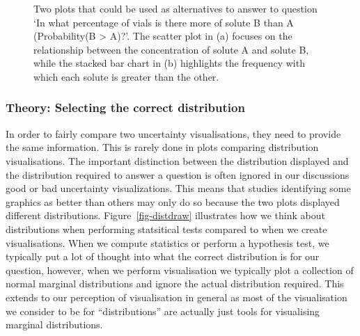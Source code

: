 \documentclass[
  letterpaper,
  DIV=11,
  numbers=noendperiod]{scrartcl}
\begin{document}
\begin{figure}
\begin{minipage}[t]{0.50\linewidth}
{{}

}

\end{minipage}%

\caption{\label{fig-alternatives}Two plots that could be used as
alternatives to answer to question `In what percentage of vials is there
more of solute B than A (Probability(B \textgreater{} A)?'. The scatter
plot in (a) focuses on the relationship between the concentration of
solute A and solute B, while the stacked bar chart in (b) highlights the
frequency with which each solute is greater than the other.}

\end{figure}

\hypertarget{theory-selecting-the-correct-distribution}{%
\subsubsection{Theory: Selecting the correct
distribution}\label{theory-selecting-the-correct-distribution}}

In order to fairly compare two uncertainty visualisations, they need to
provide the same information. This is rarely done in plots comparing
distribution visualisations. The important distinction between the
distribution displayed and the distribution required to answer a
question is often ignored in our discussions good or bad uncertainty
visualizations. This means that studies identifying some graphics as
better than others may only do so because the two plots displayed
different distributions. Figure~\ref{fig-distdraw} illustrates how we
think about distributions when performing statsitical tests compared to
when we create visualisations. When we compute statistics or perform a
hypothesis test, we typically put a lot of thought into what the correct
distribution is for our question, however, when we perform visualisation
we typically plot a collection of normal marginal distributions and
ignore the actual distribution required. This extends to our perception
of visualisation in general as most of the visualisation we consider to
be for ``distributions'' are actually just tools for visualising
marginal distributions.
\end{document}
